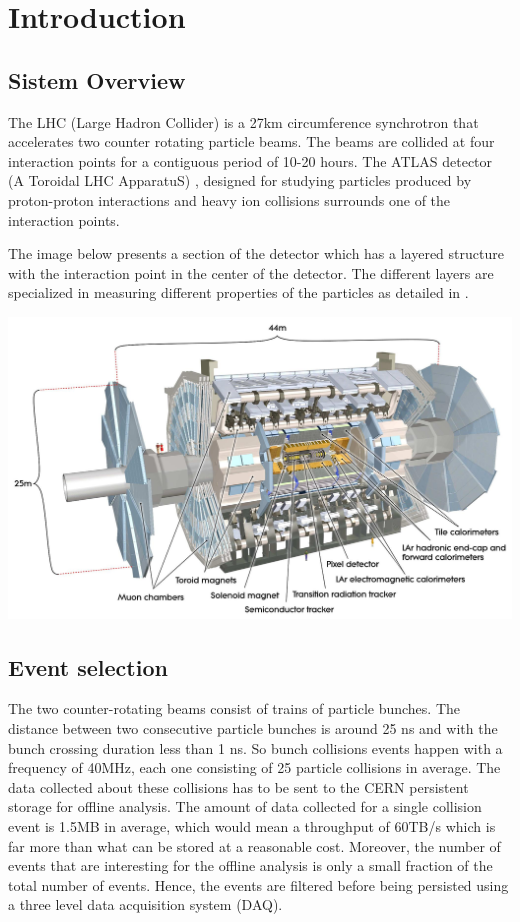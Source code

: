 \chapter{Introduction} %
\label{Capitolul1}

\section*{Sistem Overview}
The LHC (Large Hadron Collider) is a 27km circumference synchrotron that accelerates two counter rotating particle beams. The beams are collided at four interaction points for a contiguous period of 10-20 hours. The ATLAS detector (A Toroidal LHC ApparatuS) \citep{aad2008atlas}, designed for studying particles produced by proton-proton interactions and heavy ion collisions surrounds one of the interaction points. 

The image below presents a section of the detector which has a layered structure with the interaction point in the center of the detector. The different layers are specialized in measuring different properties of the particles as detailed in \citep{aad2008atlas}. 

\includegraphics[scale=0.2]{Images/Overview.jpg}

\section*{Event selection}
The two counter-rotating beams consist of trains of particle bunches. The distance between two consecutive particle bunches is around 25 ns and with the bunch crossing duration less than 1 ns. So bunch collisions events happen with a frequency of 40MHz, each one consisting of 25 particle collisions in average. The data collected about these collisions has to be sent to the CERN persistent storage \citep{baud2003castor} for offline analysis. The amount of data collected for a single collision event is 1.5MB in average, which would mean a throughput of 60TB/s which is far more than what can be stored at a reasonable cost. Moreover, the number of events that are interesting for the offline analysis is only a small fraction of the total number of events. Hence, the events are filtered before being persisted using a three level data acquisition system (DAQ). 

